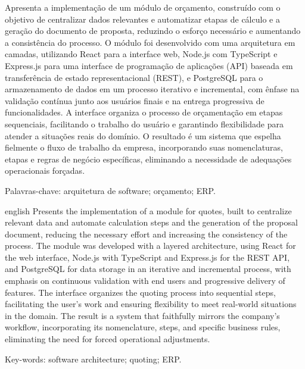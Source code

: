 \documentclass[
	article,
	12pt,				%
	oneside,
	a4paper,			%
	english,			%
	brazil				%
	]{abntex2}
\begin{document}
\setlength{\absparsep}{18pt} %
\begin{resumo}
	\indent
	Apresenta a implementação de um módulo de orçamento, construído com o objetivo de centralizar dados relevantes e automatizar etapas de cálculo e a geração do documento de proposta, reduzindo o esforço necessário e aumentando a consistência do processo.
	O módulo foi desenvolvido com uma arquitetura em camadas, utilizando React para a interface web, Node.js com TypeScript e Express.js para uma interface de programação de aplicações (API) baseada em transferência de estado representacional (REST), e PostgreSQL para o armazenamento de dados em um processo iterativo e incremental, com ênfase na validação contínua junto aos usuários finais e na entrega progressiva de funcionalidades.
	A interface organiza o processo de orçamentação em etapas sequenciais, facilitando o trabalho do usuário e garantindo flexibilidade para atender a situações reais do domínio.
	O resultado é um sistema que espelha fielmente o fluxo de trabalho da empresa, incorporando suas nomenclaturas, etapas e regras de negócio específicas, eliminando a necessidade de adequações operacionais forçadas.

	Palavras-chave: arquitetura de software; orçamento; ERP.
\end{resumo}
\clearpage

\begin{resumo}
	\begin{otherlanguage*}{english}
		\indent
		Presents the implementation of a module for quotes, built to centralize relevant data and automate calculation steps and the generation of the proposal document, reducing the necessary effort and increasing the consistency of the process.
		The module was developed with a layered architecture, using React for the web interface, Node.js with TypeScript and Express.js for the REST API, and PostgreSQL for data storage in an iterative and incremental process, with emphasis on continuous validation with end users and progressive delivery of features.
		The interface organizes the quoting process into sequential steps, facilitating the user's work and ensuring flexibility to meet real-world situations in the domain.
		The result is a system that faithfully mirrors the company's workflow, incorporating its nomenclature, steps, and specific business rules, eliminating the need for forced operational adjustments.

		Key-words: software architecture; quoting; ERP.
	\end{otherlanguage*}
\end{resumo}
\clearpage
\end{document}
